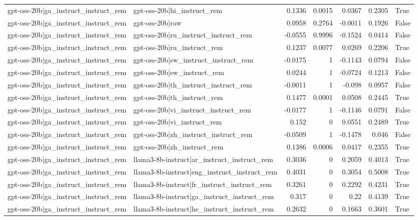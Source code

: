 \begin{table}
\begin{tabular}{l l r r r r l}
gpt-oss-20b|ga_instruct_instruct_rem & gpt-oss-20b|hi_instruct_rem & 0.1336 & 0.0015 & 0.0367 & 0.2305 & True \\
gpt-oss-20b|ga_instruct_instruct_rem & gpt-oss-20b|raw & 0.0958 & 0.2764 & -0.0011 & 0.1926 & False \\
gpt-oss-20b|ga_instruct_instruct_rem & gpt-oss-20b|ru_instruct_instruct_rem & -0.0555 & 0.9996 & -0.1524 & 0.0414 & False \\
gpt-oss-20b|ga_instruct_instruct_rem & gpt-oss-20b|ru_instruct_rem & 0.1237 & 0.0077 & 0.0269 & 0.2206 & True \\
gpt-oss-20b|ga_instruct_instruct_rem & gpt-oss-20b|sw_instruct_instruct_rem & -0.0175 & 1 & -0.1143 & 0.0794 & False \\
gpt-oss-20b|ga_instruct_instruct_rem & gpt-oss-20b|sw_instruct_rem & 0.0244 & 1 & -0.0724 & 0.1213 & False \\
gpt-oss-20b|ga_instruct_instruct_rem & gpt-oss-20b|th_instruct_instruct_rem & -0.0011 & 1 & -0.098 & 0.0957 & False \\
gpt-oss-20b|ga_instruct_instruct_rem & gpt-oss-20b|th_instruct_rem & 0.1477 & 0.0001 & 0.0508 & 0.2445 & True \\
gpt-oss-20b|ga_instruct_instruct_rem & gpt-oss-20b|vi_instruct_instruct_rem & -0.0177 & 1 & -0.1146 & 0.0791 & False \\
gpt-oss-20b|ga_instruct_instruct_rem & gpt-oss-20b|vi_instruct_rem & 0.152 & 0 & 0.0551 & 0.2489 & True \\
gpt-oss-20b|ga_instruct_instruct_rem & gpt-oss-20b|zh_instruct_instruct_rem & -0.0509 & 1 & -0.1478 & 0.046 & False \\
gpt-oss-20b|ga_instruct_instruct_rem & gpt-oss-20b|zh_instruct_rem & 0.1386 & 0.0006 & 0.0417 & 0.2355 & True \\
gpt-oss-20b|ga_instruct_instruct_rem & llama3-8b-instruct|ar_instruct_instruct_rem & 0.3036 & 0 & 0.2059 & 0.4013 & True \\
gpt-oss-20b|ga_instruct_instruct_rem & llama3-8b-instruct|eng_instruct_instruct_rem & 0.4031 & 0 & 0.3054 & 0.5008 & True \\
gpt-oss-20b|ga_instruct_instruct_rem & llama3-8b-instruct|fr_instruct_instruct_rem & 0.3261 & 0 & 0.2292 & 0.4231 & True \\
gpt-oss-20b|ga_instruct_instruct_rem & llama3-8b-instruct|ga_instruct_instruct_rem & 0.317 & 0 & 0.22 & 0.4139 & True \\
gpt-oss-20b|ga_instruct_instruct_rem & llama3-8b-instruct|he_instruct_instruct_rem & 0.2632 & 0 & 0.1663 & 0.3601 & True \\

\end{tabular}
\end{table}

